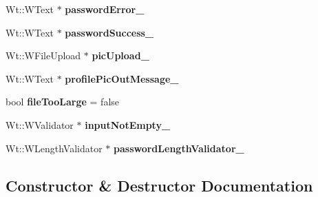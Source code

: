 \begin{DoxyCompactItemize}
\item 
Wt\+::\+W\+Text $\ast$ {\bfseries password\+Error\+\_\+}\hypertarget{classProfileWidget_abcac84401d90ac8447f3cb11951cbd76}{}\label{classProfileWidget_abcac84401d90ac8447f3cb11951cbd76}

\item 
Wt\+::\+W\+Text $\ast$ {\bfseries password\+Success\+\_\+}\hypertarget{classProfileWidget_a83350d03805517f9564bada67140d4f6}{}\label{classProfileWidget_a83350d03805517f9564bada67140d4f6}

\item 
Wt\+::\+W\+File\+Upload $\ast$ {\bfseries pic\+Upload\+\_\+}\hypertarget{classProfileWidget_a3297479e7efd5b09b1bdda6251ec08aa}{}\label{classProfileWidget_a3297479e7efd5b09b1bdda6251ec08aa}

\item 
Wt\+::\+W\+Text $\ast$ {\bfseries profile\+Pic\+Out\+Message\+\_\+}\hypertarget{classProfileWidget_afc047a157b120548478c90899668d6ba}{}\label{classProfileWidget_afc047a157b120548478c90899668d6ba}

\item 
bool {\bfseries file\+Too\+Large} = false\hypertarget{classProfileWidget_a1349cc67751fd8b5cbb6f0256fda652d}{}\label{classProfileWidget_a1349cc67751fd8b5cbb6f0256fda652d}

\item 
Wt\+::\+W\+Validator $\ast$ {\bfseries input\+Not\+Empty\+\_\+}\hypertarget{classProfileWidget_acef4ab69bb13e9c505e564aa82b1bc52}{}\label{classProfileWidget_acef4ab69bb13e9c505e564aa82b1bc52}

\item 
Wt\+::\+W\+Length\+Validator $\ast$ {\bfseries password\+Length\+Validator\+\_\+}\hypertarget{classProfileWidget_aaa2506199f35edd1dd02389b020da70f}{}\label{classProfileWidget_aaa2506199f35edd1dd02389b020da70f}

\end{DoxyCompactItemize}


\subsection{Constructor \& Destructor Documentation}
